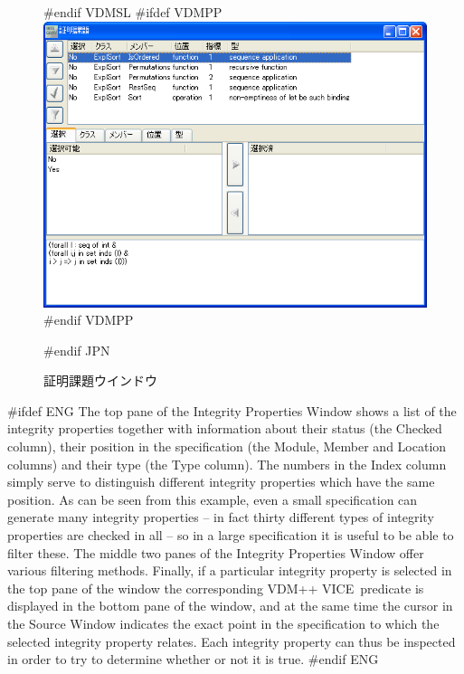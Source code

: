 \documentclass[\pformat,12pt]{article}
\newcommand{\vdmslpp}{VDM-SL}
\newcommand{\vdmslpp}{VDM++}
\renewcommand{\vdmslpp}{VDM++ VICE}
\newcommand{\guicmd}[1]{{\sf #1}}
\newcommand{\guicmd}[1]{{\gt #1}}
\begin{document}
\begin{figure}[tbh]
\begin{center}
#endif VDMSL
#ifdef VDMPP
\includegraphics[width=12.5cm]{integWin-pp.png}
#endif VDMPP
\caption{証明課題ウインドウ}
#endif JPN
\label{fig:integWin}
\end{center}
\end{figure}

#ifdef ENG
The top pane of the \guicmd{Integrity Properties Window} shows a list
of the integrity properties together with information about their
status (the \guicmd{Checked} column), their position in the specification (the
\guicmd{Module}, \guicmd{Member} and \guicmd{Location} columns) and
their type (the \guicmd{Type} column). The numbers in the
\guicmd{Index} column simply serve to distinguish different integrity
properties which have the same position. As can be seen from this
example, even a small specification can generate many integrity
properties -- in fact thirty different types of integrity properties
are checked in all -- so in a large specification it is useful to be
able to filter these. The middle two panes of the \guicmd{Integrity
  Properties Window} offer various filtering
methods. Finally, if a particular integrity 
property is selected in the top pane of the window the corresponding
\vdmslpp\ predicate is displayed in the bottom pane of the window, and
at the same time the cursor in the \guicmd{Source Window} indicates
the exact point in the specification to which the selected integrity
property relates. Each integrity property can thus be inspected in
order to try to determine whether or not it is true.
#endif ENG
\end{document}
